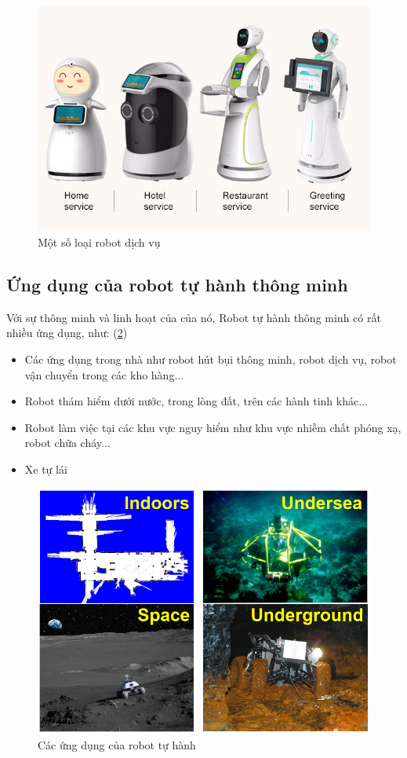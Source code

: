 \begin{figure}[tph]
	\centering
	\includegraphics[width=\linewidth]{chapter1/figs/someRb}
	\caption{Một số loại robot dịch vụ}
	\label{fig:somerb}
\end{figure}


\subsection{Ứng dụng của robot tự hành thông minh}
Với sự thông minh và linh hoạt của của nó, Robot tự hành thông minh có rất nhiều ứng dụng, như: (\figurename{\ref{fig:applications}})

\begin{itemize}
	\item Các ứng dụng trong nhà như robot hút bụi thông minh, robot dịch vụ, robot vận chuyển trong các kho hàng...
	\item Robot thám hiểm dưới nước, trong lòng đất, trên các hành tinh khác...
	\item Robot làm việc tại các khu vực nguy hiểm như khu vực nhiễm chất phóng xạ, robot chữa cháy...
	\item Xe tự lái
\end{itemize}

\begin{figure}
	\centering
	\includegraphics[width=13cm]{chapter1/figs/applications.PNG}
	\caption{Các ứng dụng của robot tự hành \cite{Burgard2010}}
	\label{fig:applications}
\end{figure}

